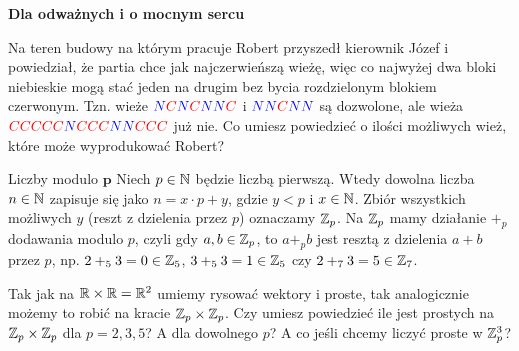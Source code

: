 \documentclass{article}
\begin{document}
\textbf{\large Dla odważnych i o mocnym sercu}

\begin{zadanie}
  Na teren budowy na którym pracuje Robert przyszedł kierownik Józef i powiedział, że partia chce jak najczerwieńszą wieżę, więc co najwyżej dwa bloki niebieskie mogą stać jeden na drugim bez bycia rozdzielonym blokiem czerwonym. Tzn. wieże $\color{blue}N\color{red}C\color{blue}N\color{red}C\color{blue}N\color{blue}N\color{red}C$ i $\color{blue}N\color{blue}N\color{red}C\color{blue}N\color{blue}N$ są dozwolone, ale wieża $\color{red}C\color{red}C\color{red}C\color{red}C\color{red}C\color{blue}N\color{red}C\color{red}C\color{red}C\color{blue}N\color{blue}N\color{red}C\color{red}C\color{red}C$ już nie. Co umiesz powiedzieć o ilości możliwych wież, które może wyprodukować Robert? 
\end{zadanie}

\begin{mybox}{Liczby modulo $\boldsymbol{p}$}
  Niech $p\in\mathbb{N}$ będzie liczbą pierwszą. Wtedy dowolna liczba $n\in\mathbb{N}$ zapisuje się jako $n=x\cdot p + y$, gdzie $y<p$ i $x\in\mathbb{N}$. Zbiór wszystkich możliwych $y$ (reszt z dzielenia przez $p$) oznaczamy $\mathbb{Z}_p$. Na $\mathbb{Z}_p$ mamy działanie $+_p$ dodawania modulo $p$, czyli gdy $a,b\in\mathbb{Z}_p$, to $a+_pb$ jest resztą z dzielenia $a+b$ przez $p$, np. $2+_53=0\in\mathbb{Z}_5$, $3+_53=1\in\mathbb{Z}_5$ czy $2+_73=5\in\mathbb{Z}_7$.
\end{mybox}

\begin{zadanie}
  Tak jak na $\mathbb{R}\times\mathbb{R}=\mathbb{R}^2$ umiemy rysować wektory i proste, tak analogicznie możemy to robić na kracie $\mathbb{Z}_p\times\mathbb{Z}_p$. Czy umiesz powiedzieć ile jest prostych na $\mathbb{Z}_p\times \mathbb{Z}_p$ dla $p=2,3,5$? A dla dowolnego $p$? A co jeśli chcemy liczyć proste w $\mathbb{Z}_p^3$?
\end{zadanie}

\noindent\makebox[\linewidth]{\rule{\textwidth}{0.4pt}}
\end{document}
